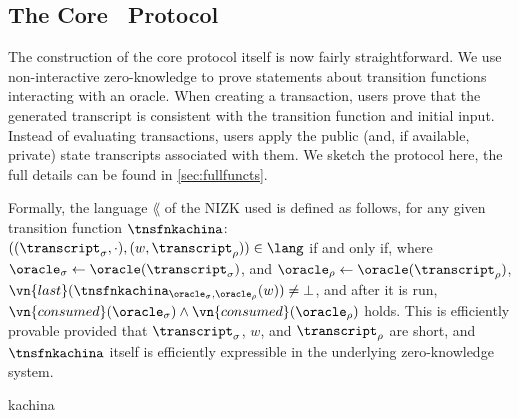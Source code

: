 \subsection{The Core \kachina\ Protocol}

\sloppy
The construction of the core protocol itself is now fairly straightforward. We use
non-interactive zero-knowledge to prove statements about transition functions
interacting with an oracle. When creating a transaction, users prove that the
generated transcript is consistent with the transition function and initial
input. Instead of evaluating transactions, users apply the public (and, if
available, private) state transcripts associated with them. We sketch the
protocol here, the full details can be found in \iffull\autoref{sec:fullfuncts}\else\cite[Appendix~C]{fullversion}\fi.

Formally, the language $\lang$ of the NIZK used is defined as follows, for any
given transition function $\tnsfnkachina$: $((\transcript_\sigma, \cdot), (w,
\transcript_\rho)) \in \lang$ if and only if, where $\oracle_\sigma \gets
\oracle(\transcript_\sigma)$, and $\oracle_\rho \gets
\oracle(\transcript_\rho)$, $\vn{last}(\tnsfnkachina_{\oracle_\sigma,
\oracle_\rho}(w)) \allowbreak\neq \bot$, and after it is run,
$\vn{consumed}(\oracle_\sigma) \land\allowbreak \vn{consumed}(\oracle_\rho)$ holds. This is
efficiently provable provided that $\transcript_\sigma$, $w$, and
$\transcript_\rho$ are short, and $\tnsfnkachina$ itself is efficiently
expressible in the underlying zero-knowledge system.

\fussy
{kachina}

